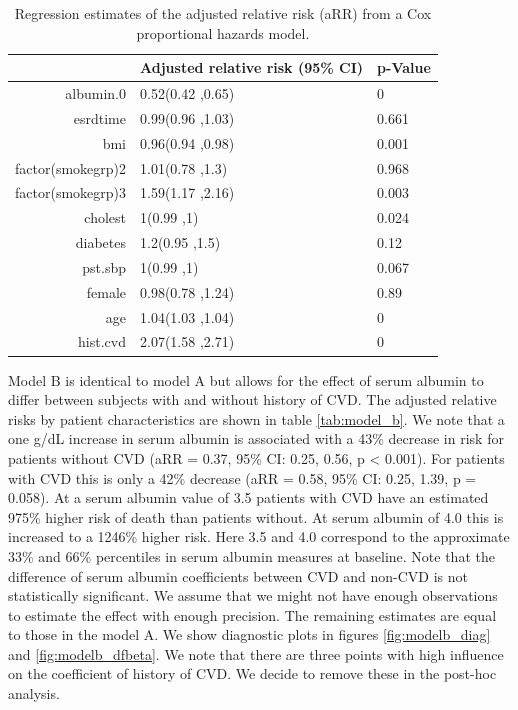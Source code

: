 \documentclass[paper=a4, fontsize=11pt]{scrartcl} %
\numberwithin{equation}{section} %
\numberwithin{figure}{section} %
\numberwithin{table}{section} %
\begin{document}
\begin{table}[ht]
\centering
\begin{tabular}{rll}
  \hline
 & Adjusted relative risk (95\% CI) & p-Value \\ 
  \hline
albumin.0 & 0.52(0.42 ,0.65) & 0 \\ 
  esrdtime & 0.99(0.96 ,1.03) & 0.661 \\ 
  bmi & 0.96(0.94 ,0.98) & 0.001 \\ 
  factor(smokegrp)2 & 1.01(0.78 ,1.3) & 0.968 \\ 
  factor(smokegrp)3 & 1.59(1.17 ,2.16) & 0.003 \\ 
  cholest & 1(0.99 ,1) & 0.024 \\ 
  diabetes & 1.2(0.95 ,1.5) & 0.12 \\ 
  pst.sbp & 1(0.99 ,1) & 0.067 \\ 
  female & 0.98(0.78 ,1.24) & 0.89 \\ 
  age & 1.04(1.03 ,1.04) & 0 \\ 
  hist.cvd & 2.07(1.58 ,2.71) & 0 \\ 
   \hline
\end{tabular}
\caption{Regression estimates of the adjusted relative risk (aRR) from a Cox proportional hazards model.}
\label{tab:model_a}
\end{table}



Model B is identical to model A but allows for the effect of serum albumin to differ between subjects with and without history of CVD. The adjusted relative risks by patient characteristics are shown in table \ref{tab:model_b}. We note that a one g/dL increase in serum albumin is associated with a 43\% decrease in risk for patients without CVD (aRR = 0.37, 95\% CI: 0.25, 0.56, p < 0.001). For patients with CVD this is only a 42\% decrease (aRR = 0.58, 95\% CI: 0.25, 1.39, p = 0.058). At a serum albumin value of 3.5 patients with CVD have an estimated 975\% higher risk of death than patients without. At serum albumin of 4.0 this is increased to a 1246\% higher risk. Here 3.5 and 4.0 correspond to the approximate 33\% and 66\% percentiles in serum albumin measures at baseline. Note that the difference of serum albumin coefficients between CVD and non-CVD is not statistically significant. We assume that we might not have enough observations to estimate the effect with enough precision.
The remaining estimates are equal to those in the model A. We show diagnostic plots in figures \ref{fig:modelb_diag} and \ref{fig:modelb_dfbeta}. We note that there are three points with high influence on the coefficient of history of CVD. We decide to remove these in the post-hoc analysis.\\
\end{document}
